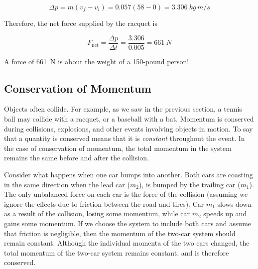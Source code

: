 \documentclass[main.tex]{subfiles}
\begin{document}
\begin{equation*}
    \Delta p = m(v_f - v_i) = 0.057(58 - 0) = \SI{3.306}{kg\,m/s}
\end{equation*}

Therefore, the net force supplied by the racquet is

\begin{equation*}
    F_{\text{net}} = \frac{\Delta p}{\Delta t} = \frac{3.306}{0.005} = \SI{661}{N}
\end{equation*}
\vspace{0.1ex}

A force of \SI{661}{N} is about the weight of a 150-pound person!

\endsolution    


\cyanhrule


\subsection{Conservation of Momentum} \label{HnP5Pm}
Objects often collide. For example, as we saw in the previous section, a tennis ball may collide with a racquet, or a baseball with a bat. Momentum is conserved during collisions, explosions, and other events involving objects in motion. To say that a quantity is conserved means that it is \textit{constant} throughout the event. In the case of conservation of momentum, the total momentum in the system remains the same before and after the collision.
\vspace{1em}

Consider what happens when one car bumps into another. Both cars are coasting in the same direction when the lead car ($m_2$), is bumped by the trailing car ($m_1$). The only unbalanced force on each car is the force of the collision (assuming we ignore the effects due to friction between the road and tires). Car $m_1$ slows down as a result of the collision, losing some momentum, while car $m_2$ speeds up and gains some momentum. If we choose the system to include both cars and assume that friction is negligible, then the momentum of the two-car system should remain constant. Although the individual momenta of the two cars changed, the total momentum of the two-car system remains constant, and is therefore conserved.
\vspace{1em}
\end{document}
